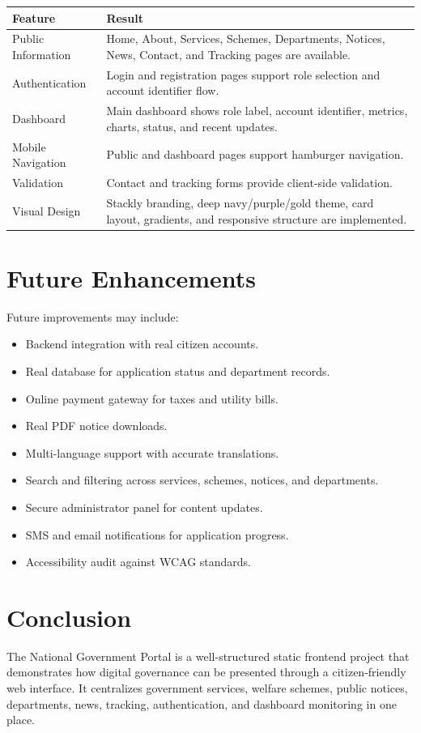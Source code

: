 \documentclass[12pt,a4paper]{report}
\begin{document}
\begin{longtable}{|p{2.1in}|p{3.5in}|}
\hline
\textbf{Feature} & \textbf{Result} \\
\hline
Public Information & Home, About, Services, Schemes, Departments, Notices, News, Contact, and Tracking pages are available. \\
\hline
Authentication & Login and registration pages support role selection and account identifier flow. \\
\hline
Dashboard & Main dashboard shows role label, account identifier, metrics, charts, status, and recent updates. \\
\hline
Mobile Navigation & Public and dashboard pages support hamburger navigation. \\
\hline
Validation & Contact and tracking forms provide client-side validation. \\
\hline
Visual Design & Stackly branding, deep navy/purple/gold theme, card layout, gradients, and responsive structure are implemented. \\
\hline
\end{longtable}

\chapter{Future Enhancements}
Future improvements may include:
\begin{itemize}[leftmargin=0.4in]
    \item Backend integration with real citizen accounts.
    \item Real database for application status and department records.
    \item Online payment gateway for taxes and utility bills.
    \item Real PDF notice downloads.
    \item Multi-language support with accurate translations.
    \item Search and filtering across services, schemes, notices, and departments.
    \item Secure administrator panel for content updates.
    \item SMS and email notifications for application progress.
    \item Accessibility audit against WCAG standards.
\end{itemize}

\chapter{Conclusion}
The National Government Portal is a well-structured static frontend project that demonstrates how digital governance can be presented through a citizen-friendly web interface. It centralizes government services, welfare schemes, public notices, departments, news, tracking, authentication, and dashboard monitoring in one place.
\end{document}
